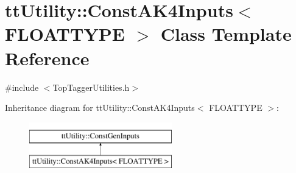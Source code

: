 \hypertarget{classttUtility_1_1ConstAK4Inputs}{\section{tt\-Utility\-:\-:Const\-A\-K4\-Inputs$<$ F\-L\-O\-A\-T\-T\-Y\-P\-E $>$ Class Template Reference}
\label{classttUtility_1_1ConstAK4Inputs}
}


{\ttfamily \#include $<$Top\-Tagger\-Utilities.\-h$>$}

Inheritance diagram for tt\-Utility\-:\-:Const\-A\-K4\-Inputs$<$ F\-L\-O\-A\-T\-T\-Y\-P\-E $>$\-:\begin{figure}[H]
\begin{center}
\leavevmode
\includegraphics[height=2.000000cm]{classttUtility_1_1ConstAK4Inputs}
\end{center}
\end{figure}
